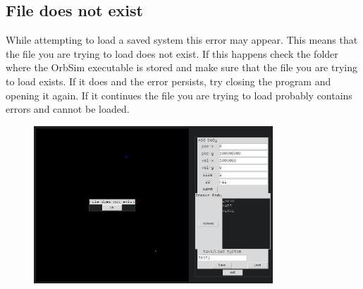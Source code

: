 \documentclass[a4paper,11pt,titlepage]{article}
\begin{document}
\subsection{File does not exist}
While attempting to load a saved system this error may appear. This means that
the file you are trying to load does not exist. If this happens check the folder
where the OrbSim executable is stored and make sure that the file you are trying
to load exists. If it does and the error persists, try closing the program and
opening it again. If it continues the file you are trying to load probably
contains errors and cannot be loaded.
\begin{figure}[H]
	\centering
	\includegraphics[width=0.8\textwidth]{../img/load.png}
\end{figure}
\end{document}
